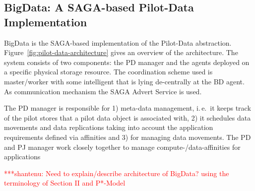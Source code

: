 \documentclass[conference,final]{IEEEtran}
\newcommand{\jhanote}[1]{ {\textcolor{red} { ***shantenu: #1 }}}
\newcommand{\alnote}[1]{ {\textcolor{blue} { ***andre: #1 }}}
\newcommand{\msnote}[1]{ {\textcolor{cyan} { ***mark: #1 }}}
\newcommand{\alnote}[1]{}
\newcommand{\jhanote}[1]{}
\newcommand{\msnote}[1]{}
\begin{document}
% 
% 
% 


\subsection{BigData: A SAGA-based Pilot-Data Implementation}
\label{sec:bigdata}

BigData is the SAGA-based implementation of the Pilot-Data abstraction.
Figure~\ref{fig:pilot-data-architecture} gives an overview of the
architecture. The system consists of two components: the PD manager and
the agents deployed on a specific physical storage resource. The coordination 
scheme used is master/worker with some intelligent that is lying de-centrally at 
the BD agent. As communication mechanism the SAGA Advert Service is used.


The PD manager is responsible for 1) meta-data management, i.\,e.\ it keeps
track of the pilot stores that a pilot data object is associated with, 2) it
schedules data movements and data replications taking into account the
application requirements defined via affinities and 3) for managing data
movements. The PD and PJ manager work closely together to manage compute-/data-affinities for applications



\jhanote{Need to explain/describe architecture of BigData? using the
  terminology of Section II and P*-Model}
\end{document}
